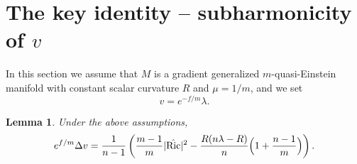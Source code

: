 \documentclass[10pt,a4paper]{amsart}
\newcommand{\Ric}{\operatorname{Ric}}
\newtheorem{lemma}[theorem]{Lemma}
\begin{document}
\section{The key identity – subharmonicity of $v$}
\label{sec:key}

In this section we assume that $M$ is a gradient generalized $m$-quasi-Einstein manifold with constant scalar curvature $R$ and $\mu=1/m$, and we set
\[
v = e^{-f/m}\lambda.
\]

\begin{lemma}\label{lem:key}
Under the above assumptions,
\begin{equation}
e^{f/m}\Delta v = \frac{1}{n-1}\left(\frac{m-1}{m}|\hat{\Ric}|^2
- \frac{R(n\lambda-R)}{n}\Bigl(1+\frac{n-1}{m}\Bigr)\right). \label{eq:key}
\end{equation}
\end{lemma}
\end{document}
